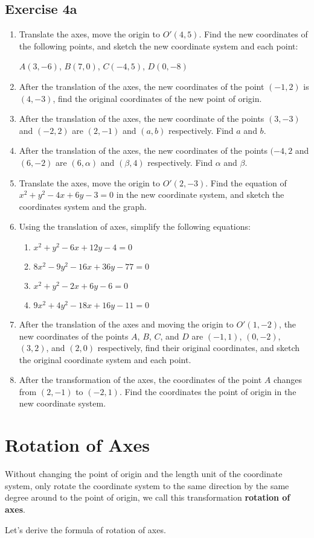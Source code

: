 \documentclass{report}
\begin{document}
\newpage
\subsection*{Exercise 4a}
\begin{enumerate}
    \item Translate the axes, move the origin to $O'(4, 5)$. Find the new coordinates of
          the following points, and sketch the new coordinate system and each point:

          $A(3, -6)$, $B(7, 0)$, $C(-4, 5)$, $D(0, -8)$
    \item After the translation of the axes, the new coordinates of the point $(-1, 2)$
          is $(4, -3)$, find the original coordinates of the new point of origin.
    \item After the translation of the axes, the new coordinate of the points $(3, -3)$
          and $(-2, 2)$ are $(2, -1)$ and $(a, b)$ respectively. Find $a$ and $b$.
    \item After the translation of the axes, the new coordinates of the points $(-4, 2$
          and $(6, -2)$ are $(6, \alpha)$ and $(\beta, 4)$ respectively. Find $\alpha$
          and $\beta$.
    \item Translate the axes, move the origin to $O'(2, -3)$. Find the equation of $x^2 +
              y^2 - 4x + 6y - 3 = 0$ in the new coordinate system, and sketch the coordinates
          system and the graph.
    \item Using the translation of axes, simplify the following equations:
          \begin{enumerate}
              \item $x^2 + y^2 - 6x + 12y - 4 = 0$
              \item $8x^2 - 9y^2 - 16x + 36y - 77 = 0$
              \item $x^2 + y^2 - 2x + 6y - 6 = 0$
              \item $9x^2 + 4y^2 - 18x + 16y - 11 = 0$
          \end{enumerate}
    \item After the translation of the axes and moving the origin to $O'(1, -2)$, the new
          coordinates of the points $A$, $B$, $C$, and $D$ are $(-1, 1)$, $(0, -2)$, $(3,
              2)$, and $(2, 0)$ respectively, find their original coordinates, and sketch the
          original coordinate system and each point.
    \item After the transformation of the axes, the coordinates of the point $A$ changes
          from $(2, -1)$ to $(-2, 1)$. Find the coordinates the point of origin in the
          new coordinate system.
\end{enumerate}

\newpage
\section{Rotation of Axes}
Without changing the point of origin and the length unit of the coordinate
system, only rotate the coordinate system to the same direction by the same
degree around to the point of origin, we call this transformation
\textbf{rotation of axes}.

Let's derive the formula of rotation of axes.
\end{document}
